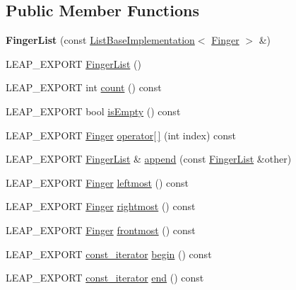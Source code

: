 \subsection*{Public Member Functions}
\begin{DoxyCompactItemize}
\item 
\hypertarget{class_leap_1_1_finger_list_a730629d5b27f07888ddb574bf06a85ef}{{\bfseries Finger\+List} (const \hyperlink{class_leap_1_1_list_base_implementation}{List\+Base\+Implementation}$<$ \hyperlink{class_leap_1_1_finger}{Finger} $>$ \&)}\label{class_leap_1_1_finger_list_a730629d5b27f07888ddb574bf06a85ef}

\item 
L\+E\+A\+P\+\_\+\+E\+X\+P\+O\+R\+T \hyperlink{class_leap_1_1_finger_list_aa04009715ecbb8b2417a1459ed3bb7fd}{Finger\+List} ()
\item 
L\+E\+A\+P\+\_\+\+E\+X\+P\+O\+R\+T int \hyperlink{class_leap_1_1_finger_list_aaa09782751e73f39e750b2546c540890}{count} () const 
\item 
L\+E\+A\+P\+\_\+\+E\+X\+P\+O\+R\+T bool \hyperlink{class_leap_1_1_finger_list_a9c44f0e3dad3efd67e4135b96976ed7f}{is\+Empty} () const 
\item 
L\+E\+A\+P\+\_\+\+E\+X\+P\+O\+R\+T \hyperlink{class_leap_1_1_finger}{Finger} \hyperlink{class_leap_1_1_finger_list_a61a359916561b6bc3b7be011f1c945cd}{operator\mbox{[}$\,$\mbox{]}} (int index) const 
\item 
L\+E\+A\+P\+\_\+\+E\+X\+P\+O\+R\+T \hyperlink{class_leap_1_1_finger_list}{Finger\+List} \& \hyperlink{class_leap_1_1_finger_list_ab032377473c269651a1110f3a5de3263}{append} (const \hyperlink{class_leap_1_1_finger_list}{Finger\+List} \&other)
\item 
L\+E\+A\+P\+\_\+\+E\+X\+P\+O\+R\+T \hyperlink{class_leap_1_1_finger}{Finger} \hyperlink{class_leap_1_1_finger_list_aa236b4cf2b2e0fc7bb4760eed44d2e17}{leftmost} () const 
\item 
L\+E\+A\+P\+\_\+\+E\+X\+P\+O\+R\+T \hyperlink{class_leap_1_1_finger}{Finger} \hyperlink{class_leap_1_1_finger_list_a9259519d48339344503fe36814084d7e}{rightmost} () const 
\item 
L\+E\+A\+P\+\_\+\+E\+X\+P\+O\+R\+T \hyperlink{class_leap_1_1_finger}{Finger} \hyperlink{class_leap_1_1_finger_list_af3e57d0957d58438269f713519fec60a}{frontmost} () const 
\item 
L\+E\+A\+P\+\_\+\+E\+X\+P\+O\+R\+T \hyperlink{class_leap_1_1_finger_list_a9ecff6e555096064a09bb66a8cb5e567}{const\+\_\+iterator} \hyperlink{class_leap_1_1_finger_list_adde4cf74c2836822b967d07ad51848cb}{begin} () const 
\item 
L\+E\+A\+P\+\_\+\+E\+X\+P\+O\+R\+T \hyperlink{class_leap_1_1_finger_list_a9ecff6e555096064a09bb66a8cb5e567}{const\+\_\+iterator} \hyperlink{class_leap_1_1_finger_list_a31f0d3b78f4257f5ffd5353b30ce894a}{end} () const 
\end{DoxyCompactItemize}

